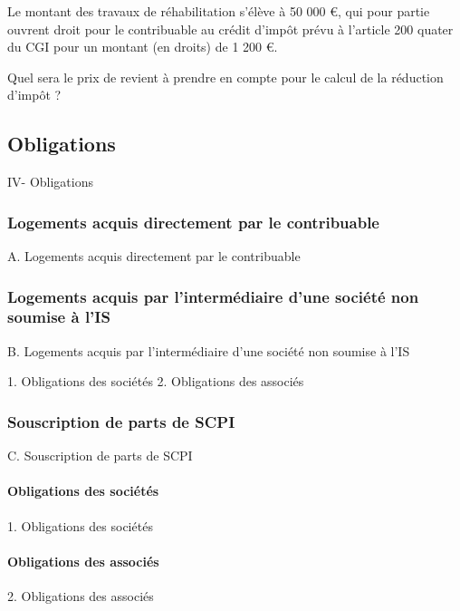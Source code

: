 			Le montant des travaux de réhabilitation s'élève à 50 000 €, qui pour partie ouvrent droit pour le contribuable au crédit d'impôt prévu à l'article 200 quater du CGI pour un montant (en droits) de 1 200 €.

			Quel sera le prix de revient à prendre en compte pour le calcul de la réduction d’impôt ?


	\subsection{Obligations}
IV- Obligations
		\subsubsection{Logements acquis directement par le contribuable}

A. Logements acquis directement par le contribuable

		\subsubsection{Logements acquis par l'intermédiaire d'une société non soumise à l'IS}
B. Logements acquis par l'intermédiaire d'une société non soumise à l'IS

1. Obligations des sociétés
2. Obligations des associés

		\subsubsection{Souscription de parts de SCPI}
C. Souscription de parts de SCPI

			\paragraph{Obligations des sociétés}
1. Obligations des sociétés

			\paragraph{Obligations des associés}

2. Obligations des associés
